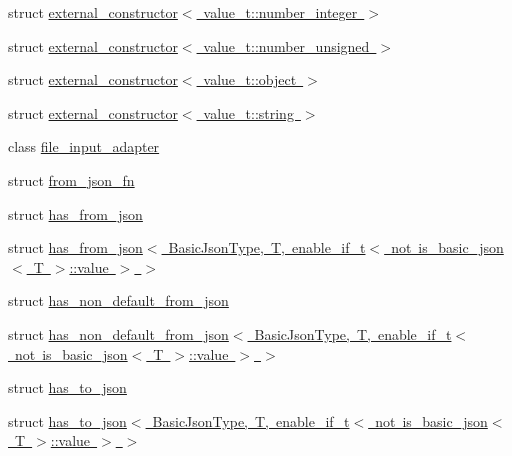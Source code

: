 \begin{DoxyCompactItemize}
struct \mbox{\hyperlink{structnlohmann_1_1detail_1_1external__constructor_3_01value__t_1_1number__integer_01_4}{external\+\_\+constructor$<$ value\+\_\+t\+::number\+\_\+integer $>$}}
\item 
struct \mbox{\hyperlink{structnlohmann_1_1detail_1_1external__constructor_3_01value__t_1_1number__unsigned_01_4}{external\+\_\+constructor$<$ value\+\_\+t\+::number\+\_\+unsigned $>$}}
\item 
struct \mbox{\hyperlink{structnlohmann_1_1detail_1_1external__constructor_3_01value__t_1_1object_01_4}{external\+\_\+constructor$<$ value\+\_\+t\+::object $>$}}
\item 
struct \mbox{\hyperlink{structnlohmann_1_1detail_1_1external__constructor_3_01value__t_1_1string_01_4}{external\+\_\+constructor$<$ value\+\_\+t\+::string $>$}}
\item 
class \mbox{\hyperlink{classnlohmann_1_1detail_1_1file__input__adapter}{file\+\_\+input\+\_\+adapter}}
\item 
struct \mbox{\hyperlink{structnlohmann_1_1detail_1_1from__json__fn}{from\+\_\+json\+\_\+fn}}
\item 
struct \mbox{\hyperlink{structnlohmann_1_1detail_1_1has__from__json}{has\+\_\+from\+\_\+json}}
\item 
struct \mbox{\hyperlink{structnlohmann_1_1detail_1_1has__from__json_3_01_basic_json_type_00_01_t_00_01enable__if__t_3_01e29213c543deddccc314d19cbaf9f3b4}{has\+\_\+from\+\_\+json$<$ Basic\+Json\+Type, T, enable\+\_\+if\+\_\+t$<$ not is\+\_\+basic\+\_\+json$<$ T $>$\+::value $>$ $>$}}
\item 
struct \mbox{\hyperlink{structnlohmann_1_1detail_1_1has__non__default__from__json}{has\+\_\+non\+\_\+default\+\_\+from\+\_\+json}}
\item 
struct \mbox{\hyperlink{structnlohmann_1_1detail_1_1has__non__default__from__json_3_01_basic_json_type_00_01_t_00_01enab81bd4c814ac1146ff15f3f4636933207}{has\+\_\+non\+\_\+default\+\_\+from\+\_\+json$<$ Basic\+Json\+Type, T, enable\+\_\+if\+\_\+t$<$ not is\+\_\+basic\+\_\+json$<$ T $>$\+::value $>$ $>$}}
\item 
struct \mbox{\hyperlink{structnlohmann_1_1detail_1_1has__to__json}{has\+\_\+to\+\_\+json}}
\item 
struct \mbox{\hyperlink{structnlohmann_1_1detail_1_1has__to__json_3_01_basic_json_type_00_01_t_00_01enable__if__t_3_01nob111e71d40e2273c290d1ce5c6a3b84f}{has\+\_\+to\+\_\+json$<$ Basic\+Json\+Type, T, enable\+\_\+if\+\_\+t$<$ not is\+\_\+basic\+\_\+json$<$ T $>$\+::value $>$ $>$}}
\item 

\end{DoxyCompactItemize}
